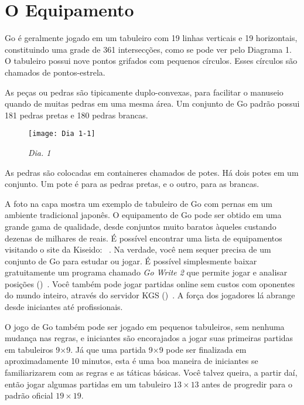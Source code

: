 \chapter{O Equipamento}

Go é geralmente jogado em um tabuleiro com 19 linhas verticais e 19 horizontais, constituindo uma grade de 361 intersecções, como se pode ver pelo Diagrama 1. O tabuleiro possui nove pontos grifados com pequenos círculos. Esses círculos são chamados de pontos-estrela.

As peças ou pedras são tipicamente duplo-convexas, para facilitar o manuseio quando de muitas pedras em uma mesma área. Um conjunto de Go padrão possui 181 pedras pretas e 180 pedras brancas.

\begin{wrapfigure}{r}{80mm}
    \begin{center}
        \texttt{[image: Dia 1-1]}
        \caption{\emph{Dia. 1}}
    \end{center}
\end{wrapfigure}

As pedras são colocadas em containeres chamados de potes. Há dois potes em um conjunto. Um pote é para as pedras pretas, e o outro, para as brancas.

A foto na capa mostra um exemplo de tabuleiro de Go com pernas em um ambiente tradicional japonês. O equipamento de Go pode ser obtido em uma grande gama de qualidade, desde conjuntos muito baratos àqueles custando dezenas de milhares de reais. É possível encontrar uma lista de equipamentos visitando o site da Kiseido: \href{https://www.kiseido.com}{}~\cite{kiseido}. Na verdade, você nem sequer precisa de um conjunto de Go para estudar ou jogar. É possível simplesmente baixar gratuitamente um programa chamado \emph{Go Write 2} que permite jogar e analisar posições (\href{https://www.gowrite.net/GOWrite2_download.html}{})~\cite{gowrite}. Você também pode jogar partidas online sem custos com oponentes do mundo inteiro, através do servidor KGS (\href{https://www.gokgs.com}{})~\cite{kgs}. A força dos jogadores lá abrange desde iniciantes até profissionais.

O jogo de Go também pode ser jogado em pequenos tabuleiros, sem nenhuma mudança nas regras, e iniciantes são encorajados a jogar suas primeiras partidas em tabuleiros 9\(\times\)9. Já que uma partida 9\(\times\)9 pode ser finalizada em aproximadamente 10 minutos, esta é uma boa maneira de iniciantes se familiarizarem com as regras e as táticas básicas. Você talvez queira, a partir daí, então jogar algumas partidas em um tabuleiro $13\times13$ antes de progredir para o padrão oficial $19\times19$.